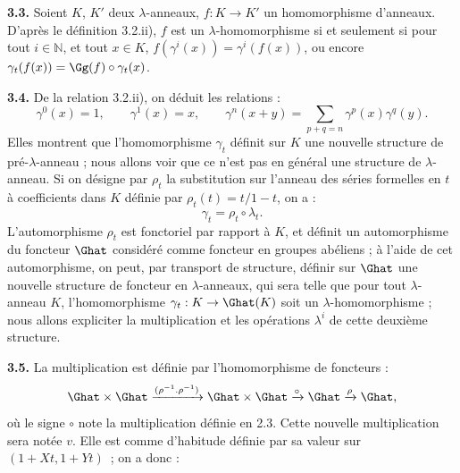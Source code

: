 \textbf{3.3.}
Soient \(K\), \(K'\) deux \(\lambda\)-anneaux, \(f:K\to K'\) un homomorphisme d'anneaux. D'après le définition 3.2.ii), \(f\) est un \(\lambda\)-homomorphisme si et seulement si pour tout \(i\in\mathbb N\), et tout \(x\in K\), \(f(\gamma^i(x))=\gamma^i(f(x))\), ou encore \(\gamma_t(f(x))=\Gg(f)\circ\gamma_t(x)\).

\textbf{3.4.} De la relation 3.2.ii), on déduit les relations :
\begin{equation}\tag{3.4.1}
  \gamma^0(x)=1,
  \qquad \gamma^1(x)=x,
  \qquad \gamma^n(x+y)=\sum_{p+q=n}\gamma^p(x)\gamma^q(y).
\end{equation}
Elles montrent que l'homomorphisme \(\gamma_t\) définit sur \(K\) une nouvelle structure de pré-\(\lambda\)-anneau ; nous allons voir que ce n'est pas en général une structure de \(\lambda\)-anneau. Si on désigne par \(\rho_t\) la substitution sur l'anneau des séries formelles en \(t\) à coefficients dans \(K\) définie par \(\rho_t(t)=t/1-t\), on a :
\[
  \gamma_t=\rho_t\circ\lambda_t.
\]
L'automorphisme \(\rho_t\) est fonctoriel par rapport à \(K\), et définit un automorphisme du foncteur \(\Ghat\) considéré comme foncteur en groupes abéliens ; à l'aide de cet automorphisme, on peut, par transport de structure, définir sur \(\Ghat\) une nouvelle structure de foncteur en \(\lambda\)-anneaux, qui sera telle que pour tout \(\lambda\)-anneau \(K\), l'homomorphisme \(\gamma_t:K\to\Ghat(K)\) soit un \(\lambda\)-homomorphisme ; nous allons expliciter la multiplication et les opérations \(\lambda^i\) de cette deuxième structure.

\textbf{3.5.} La multiplication est définie par l'homomorphisme de foncteurs :
\[
  \Ghat\times\Ghat\xrightarrow{(\rho^{-1}.\rho^{-1})}
  \Ghat\times\Ghat\xrightarrow{\circ}\Ghat\xrightarrow{\rho}\Ghat ,
\]
où le signe \(\circ\) note la multiplication définie en 2.3. Cette nouvelle multiplication sera notée \(v\). Elle est comme d'habitude définie par sa valeur sur \((1+Xt,1+Yt)\)~; on a donc :
